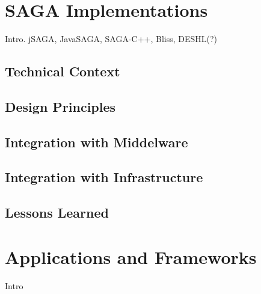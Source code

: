\documentclass[a4paper,10pt]{article}
\begin{document}
\section{SAGA Implementations}
\label{saga_impls}

Intro. jSAGA, JavaSAGA, SAGA-C++, Bliss, DESHL(?)

\subsection{Technical Context}

\subsection{Design Principles}

\subsection{Integration with Middelware}

\subsection{Integration with Infrastructure}

\subsection{Lessons Learned}

\section{Applications and Frameworks}
\label{apps_and_frameworks}

Intro

 

\end{document}

